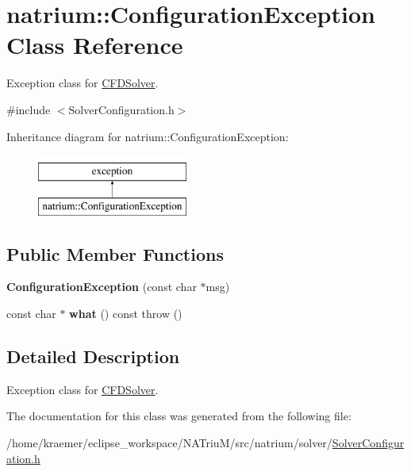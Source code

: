 \hypertarget{classnatrium_1_1ConfigurationException}{\section{natrium\-:\-:Configuration\-Exception Class Reference}
\label{classnatrium_1_1ConfigurationException}
}


Exception class for \hyperlink{classnatrium_1_1CFDSolver}{C\-F\-D\-Solver}.  




{\ttfamily \#include $<$Solver\-Configuration.\-h$>$}

Inheritance diagram for natrium\-:\-:Configuration\-Exception\-:\begin{figure}[H]
\begin{center}
\leavevmode
\includegraphics[height=2.000000cm]{classnatrium_1_1ConfigurationException}
\end{center}
\end{figure}
\subsection*{Public Member Functions}
\begin{DoxyCompactItemize}
\item 
\hypertarget{classnatrium_1_1ConfigurationException_ac9248a6224570c873784f201ef9ae34f}{{\bfseries Configuration\-Exception} (const char $\ast$msg)}\label{classnatrium_1_1ConfigurationException_ac9248a6224570c873784f201ef9ae34f}

\item 
\hypertarget{classnatrium_1_1ConfigurationException_a48c72bd9bbae81e098a1f214899b3de6}{const char $\ast$ {\bfseries what} () const   throw ()}\label{classnatrium_1_1ConfigurationException_a48c72bd9bbae81e098a1f214899b3de6}

\end{DoxyCompactItemize}


\subsection{Detailed Description}
Exception class for \hyperlink{classnatrium_1_1CFDSolver}{C\-F\-D\-Solver}. 

The documentation for this class was generated from the following file\-:\begin{DoxyCompactItemize}
\item 
/home/kraemer/eclipse\-\_\-workspace/\-N\-A\-Triu\-M/src/natrium/solver/\hyperlink{SolverConfiguration_8h}{Solver\-Configuration.\-h}\end{DoxyCompactItemize}
